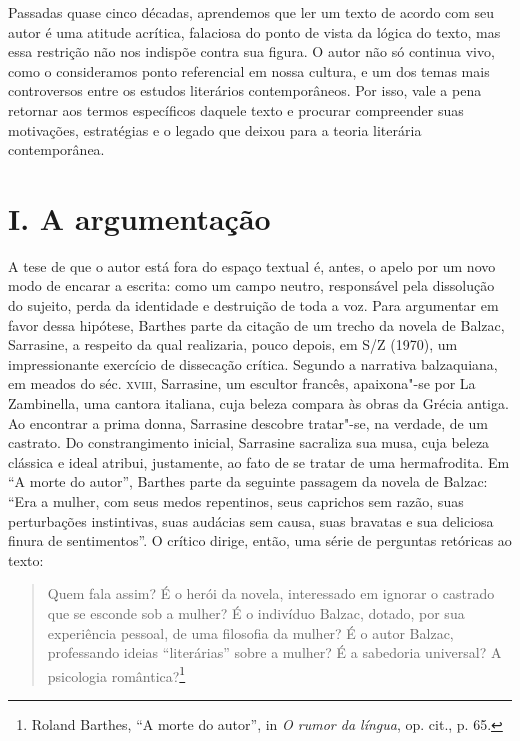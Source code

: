 Passadas quase cinco décadas, aprendemos que ler um texto de acordo com
seu autor é uma atitude acrítica, falaciosa do ponto de vista da lógica
do texto, mas essa restrição não nos indispõe contra sua figura. O autor
não só continua vivo, como o consideramos ponto referencial em nossa
cultura, e um dos temas mais controversos entre os estudos literários
contemporâneos. Por isso, vale a pena retornar aos termos específicos
daquele texto e procurar compreender suas motivações, estratégias e o
legado que deixou para a teoria literária contemporânea.

\section*{I. A argumentação}

A tese de que o autor está fora do espaço textual é, antes, o apelo por
um novo modo de encarar a escrita: como um campo neutro, responsável
pela dissolução do sujeito, perda da identidade e destruição de toda a
voz. Para argumentar em favor dessa hipótese, Barthes parte da citação
de um trecho da novela de Balzac, Sarrasine, a respeito da qual
realizaria, pouco depois, em S/Z (1970), um impressionante exercício de
dissecação crítica. Segundo a narrativa balzaquiana, em meados do séc.
\textsc{xviii}, Sarrasine, um escultor francês, apaixona"-se por La
Zambinella, uma cantora italiana, cuja beleza compara às obras da Grécia
antiga. Ao encontrar a prima donna, Sarrasine descobre tratar"-se, na
verdade, de um castrato. Do constrangimento inicial, Sarrasine sacraliza
sua musa, cuja beleza clássica e ideal atribui, justamente, ao fato de
se tratar de uma hermafrodita. Em ``A morte do autor'', Barthes parte da
seguinte passagem da novela de Balzac: ``Era a mulher, com seus medos
repentinos, seus caprichos sem razão, suas perturbações instintivas,
suas audácias sem causa, suas bravatas e sua deliciosa finura de
sentimentos''. O crítico dirige, então, uma série de perguntas retóricas
ao texto:

\begin{quote}
Quem fala assim? É o herói da novela, interessado em ignorar o castrado
que se esconde sob a mulher? É o indivíduo Balzac, dotado, por sua
experiência pessoal, de uma filosofia da mulher? É o autor Balzac,
professando ideias ``literárias'' sobre a mulher? É a sabedoria
universal? A psicologia romântica?\footnote{Roland Barthes, ``A morte do
  autor'', in \emph{O rumor da língua}, op. cit., p. 65.}
\end{quote}

